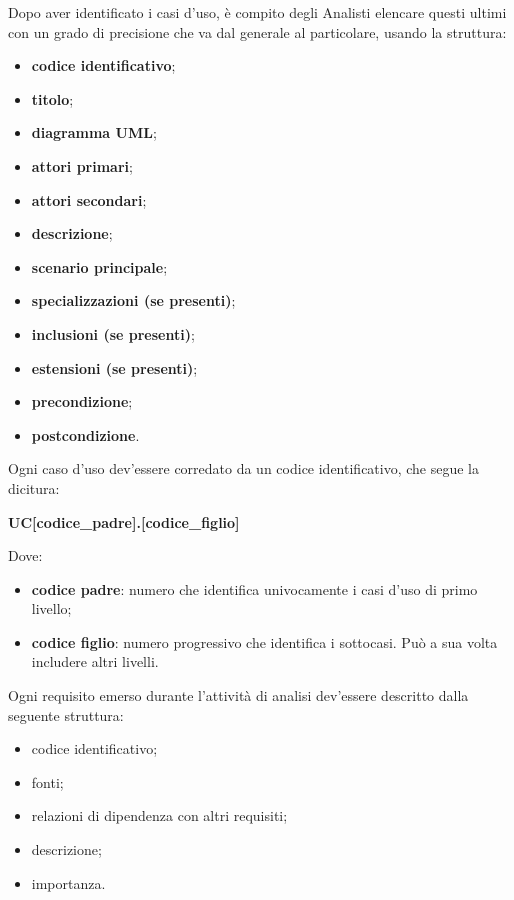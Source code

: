 		Dopo aver identificato i casi d'uso, è compito degli Analisti elencare questi ultimi con un grado di precisione che va dal generale al particolare, usando la struttura:
		\begin{itemize}
	    	\item{\textbf{codice identificativo}};
	    	\item{\textbf{titolo}};
	    	\item{\textbf{diagramma UML}};
	    	\item{\textbf{attori primari}};
	    	\item{\textbf{attori secondari}};
	    	\item{\textbf{descrizione}};
	    	\item{\textbf{scenario principale}};
    		\item{\textbf{specializzazioni (se presenti)}};
	    	\item{\textbf{inclusioni (se presenti)}};
	    	\item{\textbf{estensioni (se presenti)}};
	    	\item{\textbf{precondizione}};
	    	\item{\textbf{postcondizione}}.
		\end{itemize}

		\noindent Ogni caso d'uso dev'essere corredato da un codice identificativo, che segue la dicitura:
		\begin{center}
			\textbf{UC[codice\_padre].[codice\_figlio]}
		\end{center}

		\noindent Dove:
		\begin{itemize}
         	\item{\textbf{codice padre}: numero che identifica univocamente i casi d'uso di primo livello;}
         	\item{\textbf{codice figlio}: numero progressivo che identifica i sottocasi. Può a sua volta includere altri livelli.}
		\end{itemize}

		Ogni requisito emerso durante l'attività di analisi dev'essere descritto dalla seguente struttura:
           	\begin{itemize}
                  	\item{codice identificativo;}
                  	\item{fonti;}
                  	\item{relazioni di dipendenza con altri requisiti;}
                  	\item{descrizione;}
                  	\item{importanza.}
    			\end{itemize}

